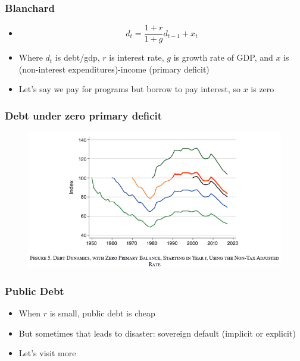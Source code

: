 \documentclass{beamer}
\begin{document}
\begin{frame}
\frametitle{Blanchard}
\begin{itemize}
\item $$d_t=\frac{1+r}{1+g}d_{t-1}+x_t$$
\item Where $d_t$ is debt/gdp, $r$ is interest rate, $g$ is growth rate of GDP, and $x$ is (non-interest expenditures)-income (primary deficit)
\bigskip
\item Let's say we pay for programs but borrow to pay interest, so $x$ is zero
\end{itemize}
\end{frame}


\begin{frame}
\frametitle{Debt under zero primary deficit}
\begin{figure}
\includegraphics[scale=0.5]{Blanchard2.png}
\end{figure}
\end{frame}

\begin{frame}
\frametitle{Public Debt}
\begin{itemize}
\item When $r$ is small, public debt is cheap
\bigskip
\item But sometimes that leads to disaster:  sovereign default  (implicit or explicit)
\bigskip
\item Let's visit more
\end{itemize}
\end{frame}
\end{document}
